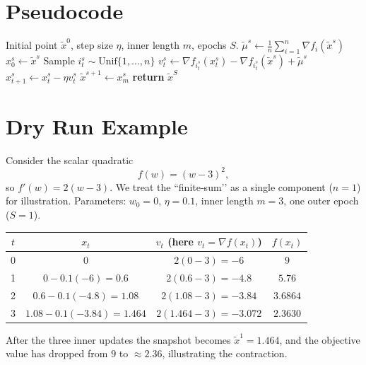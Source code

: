 \documentclass{article}
\begin{document}
\section*{Pseudocode}
\begin{algorithm}[H]
\caption{SVRG (double‑loop version)}\label{alg:svrg}
\begin{algorithmic}[1]
\Require Initial point $\tilde{x}^{0}$, step size $\eta$, inner length $m$, epochs $S$.
    \State $\tilde{\mu}^{s}\gets \frac{1}{n}\sum_{i=1}^{n}\nabla f_i(\tilde{x}^{s})$ 
    \State $x_{0}^{s}\gets \tilde{x}^{s}$
        \State Sample $i_t^{s}\sim\text{Unif}\{1,\dots,n\}$
        \State $v_{t}^{s}\gets \nabla f_{i_t^{s}}(x_{t}^{s})-\nabla f_{i_t^{s}}(\tilde{x}^{s})+\tilde{\mu}^{s}$
        \State $x_{t+1}^{s}\gets x_{t}^{s}-\eta v_{t}^{s}$
    \EndFor
    \State $\tilde{x}^{s+1}\gets x_{m}^{s}$
\EndFor
\State \textbf{return} $\tilde{x}^{S}$
\end{algorithmic}
\end{algorithm}

\section*{Dry Run Example}
Consider the scalar quadratic
\[
f(w)=(w-3)^{2},
\]
so $f'(w)=2(w-3)$.  
We treat the “finite‑sum’’ as a single component ($n=1$) for illustration.  
Parameters: $w_{0}=0$, $\eta=0.1$, inner length $m=3$, one outer epoch ($S=1$).

\begin{center}
\begin{tabular}{c|c|c|c}
$t$ & $x_t$ & $v_t$ (here $v_t=\nabla f(x_t)$) & $f(x_t)$\\\hline
0 & $0$ & $2(0-3)=-6$ & $9$\\
1 & $0-0.1(-6)=0.6$ & $2(0.6-3)=-4.8$ & $5.76$\\
2 & $0.6-0.1(-4.8)=1.08$ & $2(1.08-3)=-3.84$ & $3.6864$\\
3 & $1.08-0.1(-3.84)=1.464$ & $2(1.464-3)=-3.072$ & $2.3630$\\
\end{tabular}
\end{center}
After the three inner updates the snapshot becomes $\tilde{x}^{1}=1.464$, and the objective value has dropped from $9$ to $\approx2.36$, illustrating the contraction.

\newpage
\end{document}
